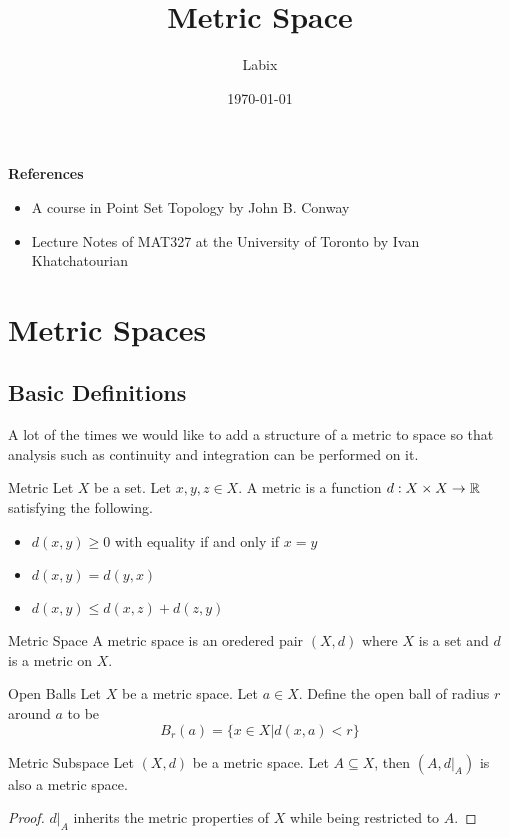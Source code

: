 \documentclass[a4paper]{article}
\title{Metric Space}
\author{Labix}
\date{\today}
\begin{document}
\maketitle
\begin{abstract}
\end{abstract}
\textbf{References}
\begin{itemize}
\item A course in Point Set Topology by John B. Conway
\item Lecture Notes of MAT327 at the University of Toronto by Ivan Khatchatourian
\end{itemize}
\pagebreak
\tableofcontents
\pagebreak
\section{Metric Spaces}
\subsection{Basic Definitions}
A lot of the times we would like to add a structure of a metric to space so that analysis such as continuity and integration can be performed on it. 

\begin{defn}{Metric}{} Let $X$ be a set. Let $x,y,z\in X$. A metric is a function $d:X\times X\to\mathbb{R}$ satisfying the following. 
\begin{itemize}
\item $d(x,y)\geq 0$ with equality if and only if $x=y$
\item $d(x,y)=d(y,x)$
\item $d(x,y)\leq d(x,z)+d(z,y)$
\end{itemize}
\end{defn}

\begin{defn}{Metric Space}{} A metric space is an oredered pair $(X,d)$ where $X$ is a set and $d$ is a metric on $X$. 
\end{defn}

\begin{defn}{Open Balls}{} Let $X$ be a metric space. Let $a\in X$. Define the open ball of radius $r$ around $a$ to be $$B_r(a)=\{x\in X|d(x,a)<r\}$$
\end{defn}

\begin{lmm}{Metric Subspace}{} Let $(X,d)$ be a metric space. Let $A\subseteq X$, then $(A,d|_A)$ is also a metric space. 
\begin{proof}
$d|_A$ inherits the metric properties of $X$ while being restricted to $A$. 
\end{proof}
\end{lmm}
\end{document}
